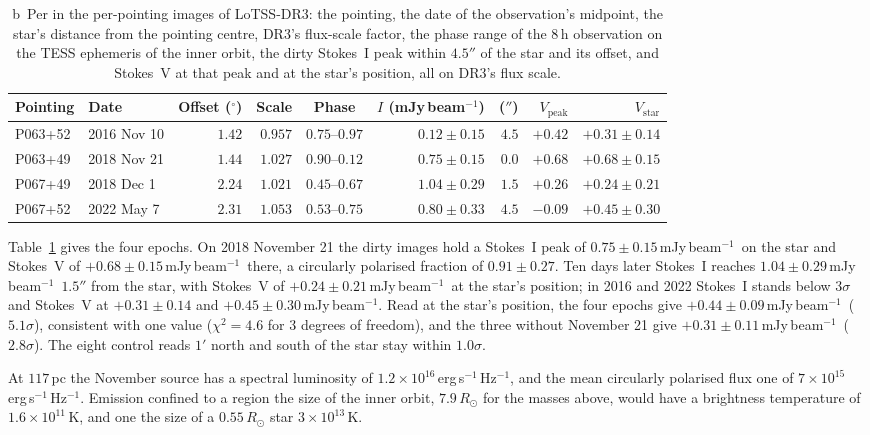 \documentclass[3p,11pt]{elsarticle}
\newcommand{\mJyb}{mJy\,beam$^{-1}$}
\newcommand{\lnu}{erg\,s$^{-1}$\,Hz$^{-1}$}
\newcommand{\sci}[2]{#1\times10^{#2}}
\newcommand{\Rsun}{R_\odot}
\begin{document}
\begin{table}[t]
\centering\small
\caption{b~Per in the per-pointing images of LoTSS-DR3: the pointing, the date of the
observation's midpoint, the star's distance from the pointing centre, DR3's flux-scale
factor, the phase range of the $8$\,h observation on the TESS ephemeris of the inner
orbit, the dirty Stokes~I peak within $4.5''$ of the star and its offset, and Stokes~V at
that peak and at the star's position, all on DR3's flux scale.}
\label{tab:lofar}
\setlength{\tabcolsep}{4.5pt}
\begin{tabular}{llrrcrrrr}
\toprule
Pointing & Date & Offset ($^\circ$) & Scale & Phase & $I$ (\mJyb) & ($''$) & $V_\mathrm{peak}$ & $V_\mathrm{star}$ \\
\midrule
P063+52 & 2016 Nov 10 & $1.42$ & $0.957$ & $0.75$--$0.97$ & $0.12\pm0.15$ & $4.5$ & $+0.42$ & $+0.31\pm0.14$ \\
P063+49 & 2018 Nov 21 & $1.44$ & $1.027$ & $0.90$--$0.12$ & $0.75\pm0.15$ & $0.0$ & $+0.68$ & $+0.68\pm0.15$ \\
P067+49 & 2018 Dec 1 & $2.24$ & $1.021$ & $0.45$--$0.67$ & $1.04\pm0.29$ & $1.5$ & $+0.26$ & $+0.24\pm0.21$ \\
P067+52 & 2022 May 7 & $2.31$ & $1.053$ & $0.53$--$0.75$ & $0.80\pm0.33$ & $4.5$ & $-0.09$ & $+0.45\pm0.30$ \\
\bottomrule
\end{tabular}
\end{table}

Table~\ref{tab:lofar} gives the four epochs. On 2018 November 21 the dirty images hold a
Stokes~I peak of $0.75\pm0.15$\,\mJyb\ on the star and Stokes~V of $+0.68\pm0.15$\,\mJyb\
there, a circularly polarised fraction of $0.91\pm0.27$. Ten days later Stokes~I reaches
$1.04\pm0.29$\,\mJyb\ $1.5''$ from the star, with Stokes~V of $+0.24\pm0.21$\,\mJyb\ at the
star's position; in 2016 and 2022 Stokes~I stands below $3\sigma$ and Stokes~V at
$+0.31\pm0.14$ and $+0.45\pm0.30$\,\mJyb. Read at the star's position, the four epochs give
$+0.44\pm0.09$\,\mJyb\ ($5.1\sigma$), consistent with one value ($\chi^2=4.6$ for $3$
degrees of freedom), and the three without November 21 give $+0.31\pm0.11$\,\mJyb\
($2.8\sigma$). The eight control reads $1'$ north and south of the star stay within
$1.0\sigma$.

At $117$\,pc the November source has a spectral luminosity of $\sci{1.2}{16}$\,\lnu, and
the mean circularly polarised flux one of $\sci{7}{15}$\,\lnu. Emission confined to a
region the size of the inner orbit, $7.9\,\Rsun$ for the masses above, would have a
brightness temperature of $\sci{1.6}{11}$\,K, and one the size of a $0.55\,\Rsun$ star
$\sci{3}{13}$\,K.
\end{document}
